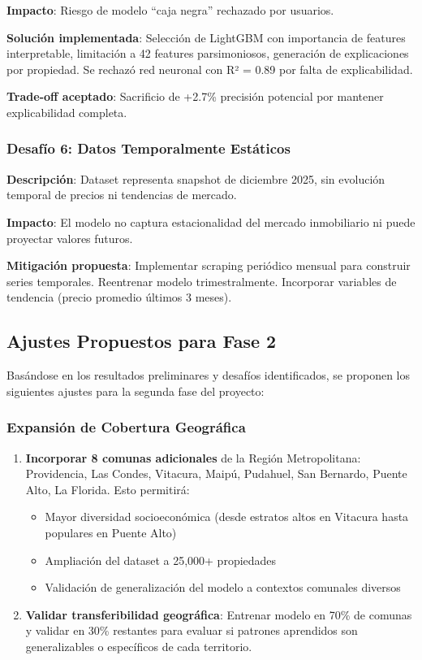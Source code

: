 \textbf{Impacto}: Riesgo de modelo ``caja negra'' rechazado por usuarios.

\textbf{Solución implementada}: Selección de LightGBM con importancia de features interpretable, limitación a 42 features parsimoniosos, generación de explicaciones por propiedad. Se rechazó red neuronal con R² = 0.89 por falta de explicabilidad.

\textbf{Trade-off aceptado}: Sacrificio de +2.7\% precisión potencial por mantener explicabilidad completa.

\subsubsection{Desafío 6: Datos Temporalmente Estáticos}

\textbf{Descripción}: Dataset representa snapshot de diciembre 2025, sin evolución temporal de precios ni tendencias de mercado.

\textbf{Impacto}: El modelo no captura estacionalidad del mercado inmobiliario ni puede proyectar valores futuros.

\textbf{Mitigación propuesta}: Implementar scraping periódico mensual para construir series temporales. Reentrenar modelo trimestralmente. Incorporar variables de tendencia (precio promedio últimos 3 meses).

\subsection{Ajustes Propuestos para Fase 2}

Basándose en los resultados preliminares y desafíos identificados, se proponen los siguientes ajustes para la segunda fase del proyecto:

\subsubsection{Expansión de Cobertura Geográfica}

\begin{enumerate}
    \item \textbf{Incorporar 8 comunas adicionales} de la Región Metropolitana: Providencia, Las Condes, Vitacura, Maipú, Pudahuel, San Bernardo, Puente Alto, La Florida. Esto permitirá:
    \begin{itemize}
        \item Mayor diversidad socioeconómica (desde estratos altos en Vitacura hasta populares en Puente Alto)
        \item Ampliación del dataset a 25,000+ propiedades
        \item Validación de generalización del modelo a contextos comunales diversos
    \end{itemize}
    
    \item \textbf{Validar transferibilidad geográfica}: Entrenar modelo en 70\% de comunas y validar en 30\% restantes para evaluar si patrones aprendidos son generalizables o específicos de cada territorio.
\end{enumerate}

